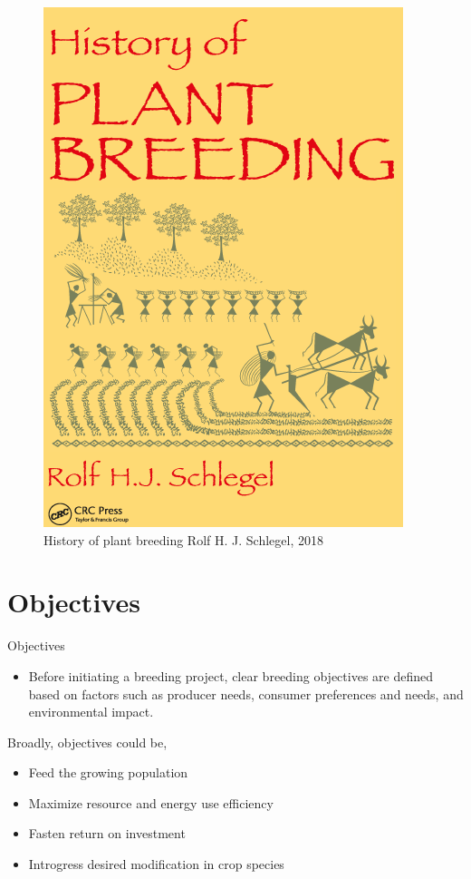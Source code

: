 \documentclass[11pt,ignorenonframetext,aspectratio=169]{beamer}
\providecommand{\tightlist}{%
  \setlength{\itemsep}{0pt}\setlength{\parskip}{0pt}}
\begin{document}
\begin{frame}{}
\protect\hypertarget{section-15}{}
\begin{figure}
\includegraphics[width=0.4\linewidth,height=0.7\textwidth, keepaspectratio]{./images/plant_breeding_history} \caption{History of plant breeding Rolf H. J. Schlegel, 2018}\label{fig:plb-history-book}
\end{figure}
\end{frame}

\hypertarget{objectives}{%
\section{Objectives}\label{objectives}}

\begin{frame}{Objectives}
\begin{itemize}
\tightlist
\item
  Before initiating a breeding project, clear breeding objectives are
  defined based on factors such as producer needs, consumer preferences
  and needs, and environmental impact.
\end{itemize}
\end{frame}

\begin{frame}{Broadly, objectives could be,}
\protect\hypertarget{broadly-objectives-could-be}{}
\begin{itemize}
\tightlist
\item
  Feed the growing population
\item
  Maximize resource and energy use efficiency
\item
  Fasten return on investment
\item
  Introgress desired modification in crop species
\end{itemize}
\end{frame}
\end{document}

